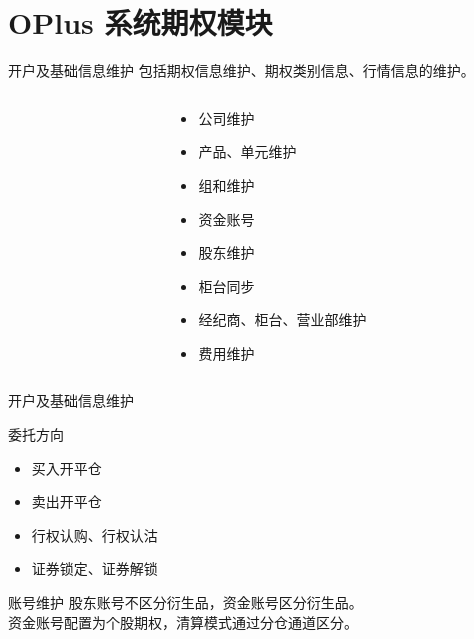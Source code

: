 \documentclass[12pt]{ctexbeamer}	%
\begin{document}

\section{OPlus 系统期权模块}

\begin{frame}{开户及基础信息维护}
  包括期权信息维护、期权类别信息、行情信息的维护。
  \begin{columns}
    \begin{column}{0.60\textwidth}
    \end{column}
    \begin{column}{0.40\textwidth}
      \begin{itemize}
        \item 公司维护
        \item 产品、单元维护
        \item 组和维护
        \item 资金账号
        \item 股东维护
        \item 柜台同步
        \item 经纪商、柜台、营业部维护
        \item 费用维护
      \end{itemize}
    \end{column}
  \end{columns}
\end{frame}

\begin{frame}{开户及基础信息维护}
  \begin{block}{委托方向}
    \begin{itemize}
      \item 买入开平仓
      \item 卖出开平仓
      \item 行权认购、行权认沽
      \item 证券锁定、证券解锁
    \end{itemize}
  \end{block}
  \begin{block}{账号维护}
    股东账号不区分衍生品，资金账号区分衍生品。\\
    资金账号配置为个股期权，清算模式通过分仓通道区分。
  \end{block}
\end{frame}
\end{document}
